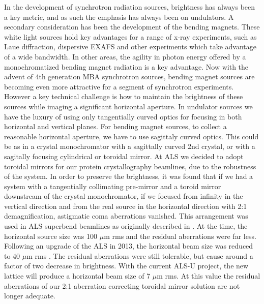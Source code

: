 \documentclass{iucr}              %
\newcommand{\inred}[1]{{\color{red}#1}}
\begin{document}
In the development of synchrotron radiation sources, brightness has always been a key metric, and as such the emphasis has always been on undulators.  A secondary consideration has been the development of the bending magnets. These white light sources hold key advantages for a range of x-ray experiments, such as Laue diffraction, dispersive EXAFS and other experiments which take advantage of a wide bandwidth.  In other areas, the agility in photon energy offered by a monochromatized bending magnet radiation is a key advantage.  Now with the advent of 4th generation MBA synchrotron sources, bending magnet sources are becoming even more attractive for a segment of synchrotron experiments.  However a key technical challenge is how to maintain the brightness of these sources while imaging a significant horizontal aperture.  In undulator sources we have the luxury of using only tangentially curved optics for focusing in both horizontal and vertical planes.  For bending magnet sources, to collect a reasonable horizontal aperture, we have to use sagittaly curved optics.  This could be as in a crystal monochromator with a sagittally curved 2nd crystal, or with a sagitally focusing cylindrical or toroidal mirror.  At ALS we decided to adopt toroidal mirrors for our protein crystallography beamlines, due to the robustness of the system.  In order to preserve the brightness, it was found that if we had a system with a tangentially collimating pre-mirror and a toroid mirror downstream of the crystal monochromator, if we focused from infinity in the vertical direction and from the real source in the horizontal direction with 2:1 demagnification,  astigmatic coma aberrations vanished. \inred{This arrangement was used in ALS superbend beamlines as originally described in  \cite{MacDowell2004}.}
At the time, the horizontal source size was 100 $\mu$m rms and the residual aberrations were far less.  Following an upgrade of the ALS in 2013, the horizontal beam size was reduced to 40 $\mu$m  rms \cite{Steier_2014}. The residual aberrations were still tolerable, but cause around a factor of two decrease in brightness.  With the current ALS-U project, the new lattice will produce a horizontal beam size of 7 $\mu$m rms.  At this value the residual aberrations of our 2:1 aberration correcting toroidal mirror solution are \inred{not} longer adequate.
\end{document}
